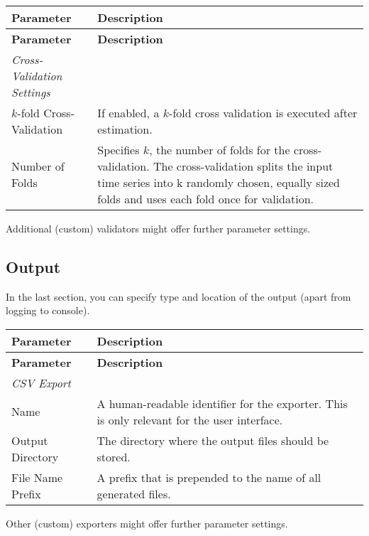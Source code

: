 \begin{tabularx}{\textwidth}{lX}
    \toprule
    \textbf{Parameter} & \textbf{Description} \\
    \midrule
    \endfirsthead %
    \toprule
    \textbf{Parameter} & \textbf{Description} \\
    \midrule
    \endhead %
    \bottomrule
    \endfoot
    \textit{Cross-Validation Settings} \\
    $k$-fold Cross-Validation &  If enabled, a $k$-fold cross validation is executed after
    estimation.\\
    Number of Folds &  Specifies $k$, the number of folds for the cross-validation.
    The cross-validation splits the input
    time series into k randomly chosen, equally sized
    folds and uses each fold once for validation.

\end{tabularx}

Additional (custom) validators might offer further parameter settings.

\subsection{Output}
In the last section, you can specify type and location of the output (apart from logging to console).
\begin{tabularx}{\textwidth}{lX}
    \toprule
    \textbf{Parameter} & \textbf{Description} \\
    \midrule
    \endfirsthead %
    \toprule
    \textbf{Parameter} & \textbf{Description} \\
    \midrule
    \endhead %
    \bottomrule
    \endfoot
    \textit{CSV Export} \\
    Name & A human-readable identifier for the exporter. This
    is only relevant for the user interface. \\
    Output Directory & The directory where the output files should be
    stored. \\
    File Name Prefix & A prefix that is prepended to the name of all generated
    files.
\\
\end{tabularx}

Other (custom) exporters might offer further parameter settings.

